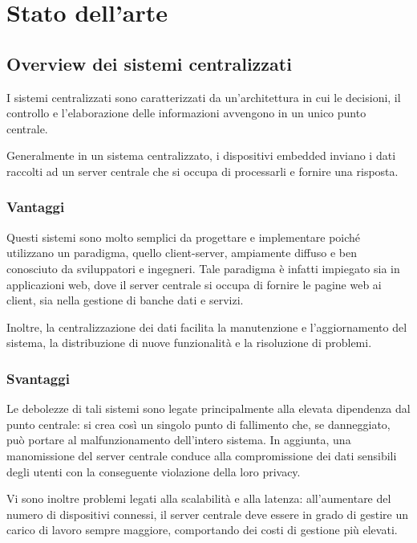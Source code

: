 \chapter{Stato dell'arte}

\section{Overview dei sistemi centralizzati}

I sistemi centralizzati sono caratterizzati da un'architettura in cui le decisioni, il controllo 
e l'elaborazione delle informazioni avvengono in un unico punto centrale. 

Generalmente in un sistema centralizzato, i dispositivi embedded inviano i dati raccolti ad un server centrale
che si occupa di processarli e fornire una risposta.

\subsection{Vantaggi}

Questi sistemi sono molto semplici da progettare e implementare poiché utilizzano un paradigma,
quello client-server, ampiamente diffuso e ben conosciuto da sviluppatori e ingegneri. Tale paradigma è infatti impiegato
sia in applicazioni web, dove il server centrale si occupa di fornire le pagine web ai client,
sia nella gestione di banche dati e servizi.

Inoltre, la centralizzazione dei dati facilita la manutenzione e l'aggiornamento del sistema, la distribuzione
di nuove funzionalità e la risoluzione di problemi.

\subsection{Svantaggi}

Le debolezze di tali sistemi sono legate principalmente alla elevata dipendenza dal punto centrale:
si crea così un singolo punto di fallimento che, se danneggiato, può portare al malfunzionamento dell'intero sistema.
In aggiunta, una manomissione del server centrale conduce alla compromissione
dei dati sensibili degli utenti con la conseguente violazione della loro privacy.

Vi sono inoltre problemi legati alla scalabilità e alla latenza: all'aumentare del numero di dispositivi
connessi, il server centrale deve essere in grado di gestire un carico di lavoro sempre maggiore, comportando dei costi di gestione più elevati.

